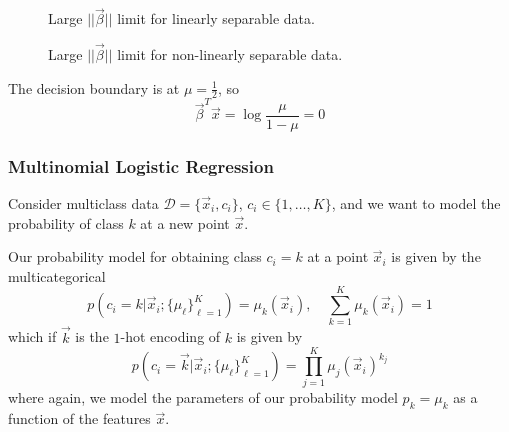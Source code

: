 
\begin{figure}[!htb]
    \centering
    
    \caption{Large $||\vec{\beta}||$ limit for linearly separable data.}
    \label{fig:separable_w_inf}
\end{figure}


\begin{figure}[!htb]
    \centering
    
    \caption{Large $||\vec{\beta}||$ limit for non-linearly separable data.}
    \label{fig:non_separable_w_inf}
\end{figure}

The decision boundary is at $\mu = \frac{1}{2}$, so
\begin{equation}
    \vec{\beta}^T \vec{x} = \log \frac{\mu}{1-\mu} = 0
\end{equation}

\subsubsection{Multinomial Logistic Regression}
Consider multiclass data $\mathcal{D} = \{ \vec{x}_i, c_i \}$, $c_i \in \{1, \ldots, K\}$, and we want to model the probability of class $k$ at a new point $\vec{x}$.

Our probability model for obtaining class $c_i = k$ at a point $\vec{x}_i$ is given by the multicategorical
\begin{equation}
    p\left(c_i = k | \vec{x}_i; \{\mu_{\ell} \}_{\ell=1}^K\right) = \mu_k(\vec{x}_i), \quad \sum_{k=1}^K \mu_k(\vec{x}_i) = 1
\end{equation}
which if $\vec{k}$ is the $1$-hot encoding of $k$ is given by
\begin{equation}
    p\left(c_i = \vec{k} | \vec{x}_i; \{\mu_{\ell} \}_{\ell=1}^K\right) = \prod_{j=1}^K \mu_j(\vec{x}_i)^{k_j}
\end{equation}
where again, we model the parameters of our probability model $p_k = \mu_k$ as a function of the features $\vec{x}$.

